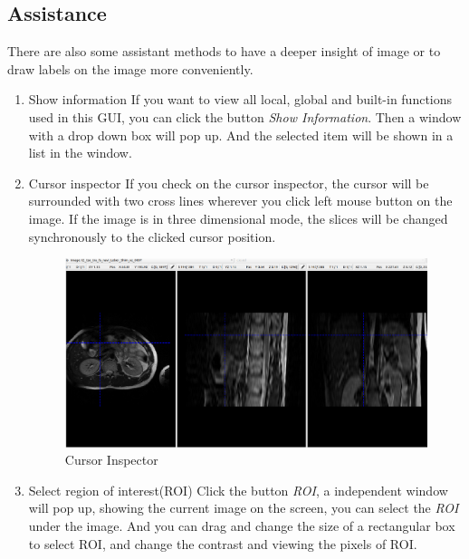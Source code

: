 \documentclass[12pt]{article}
\begin{document}
\subsection{Assistance}
There are also some assistant methods to have a deeper insight of image or to draw labels on the image more conveniently.
\begin{enumerate}
	\item Show information
	\newline If you want to view all local, global and built-in functions used in this GUI, you can click the button \textit{Show Information}. Then a window with a drop down box will pop up. And the selected item will be shown in a list in the window.	
	\item Cursor inspector
	\newline If you check on the cursor inspector, the cursor will be surrounded with two cross lines wherever you click left mouse button on the image. If the image is in three dimensional mode, the slices will be changed synchronously to the clicked cursor position.
	\begin{figure}[htbp]	
		\centering
		\includegraphics[width=\textwidth]{cursor_inspector.png}
		\caption[Cursor Inspector]{Cursor Inspector}
		\label{fig:cursor_inspector}
	\end{figure}
	\item Select region of interest(ROI)
	\newline Click the button \textit{ROI}, a independent window will pop up, showing the current image on the screen, you can select the \textit{ROI} under the image. And you can drag and change the size of a rectangular box to select ROI, and change the contrast and viewing the pixels of ROI.
	\begin{figure}[htbp]	
		\centering

\end{figure}
\end{enumerate}
\end{document}
